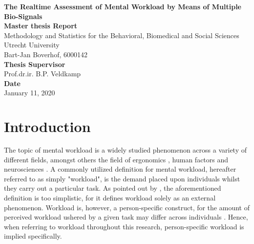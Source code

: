 \documentclass[12pt]{article}
\begin{document}
\begin{titlepage}
\begin{center}
\LARGE{\textbf{The Realtime Assessment of Mental Workload by Means of Multiple Bio-Signals}}\\
\vspace*{2\baselineskip}
\Large{\textbf{Master thesis Report}}\\
Methodology and Statistics for the Behavioral, Biomedical and Social Sciences\\
\vspace*{1\baselineskip}
Utrecht University\\
\vspace*{4\baselineskip}
{Bart-Jan Boverhof, 6000142}\\
\vspace*{1\baselineskip}
{\textbf{Thesis Supervisor}}\\
Prof.dr.ir. B.P. Veldkamp\\
\vspace*{1\baselineskip}
{\textbf{Date}}\\
January 11, 2020\\
\vspace*{1\baselineskip}
\end{center}
\end{titlepage}

\section{Introduction}
The topic of mental workload is a widely studied 
phenomenon across a variety of different fields, amongst others the field of ergonomics \cite{young2015state}, human factors \cite{pretorius2007development} and neurosciences \cite{shuggi2017mental}. A commonly utilized definition for mental workload, hereafter referred to as simply "workload", is the demand placed upon individuals whilst they carry out a particular task. As pointed out by , the aforementioned definition is too simplistic, for it defines workload solely as an external phenomenon. Workload is, however, a person-specific construct, for the amount of perceived workload ushered by a given task may differ across individuals \cite{de1996measurement}. Hence, when referring to workload throughout this research, person-specific workload is implied specifically. 
\end{document}
